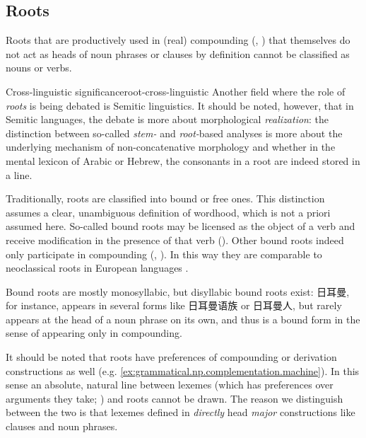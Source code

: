 \documentclass[UTF8, a4paper, oneside, scheme=plain, 12pt]{ctexrep}
\newcommand*{\term}[1]{\emph{#1}}
\begin{document}
\subsection{Roots}\label{sec:grammatical.lexicon.roots}

Roots that are productively used in (real) compounding 
(,
)
that themselves do not act as heads of noun phrases or clauses
by definition cannot be classified as nouns or verbs.

\begin{infobox}{Cross-linguistic significance}{root-cross-linguistic}
    Another field where the role of \term{roots} is being debated is Semitic linguistics.
    It should be noted, however, that in Semitic languages,
    the debate is more about morphological \term{realization}:
    the distinction between so-called \term{stem-} and \term{root-}based analyses
    is more about the underlying mechanism of non-concatenative morphology
    and whether in the mental lexicon of Arabic or Hebrew,
    the consonants in a root are indeed stored in a line.
\end{infobox}

Traditionally, roots are classified into bound or free ones.
This distinction assumes a clear, unambiguous definition of wordhood,
which is not a priori assumed here.
So-called bound roots may be licensed as the object of a verb
and receive modification in the presence of that verb 
().
Other bound roots indeed only participate in compounding
(,
).
In this way they are comparable to neoclassical roots in European languages
\citep{di2005decomposing,scher2014unifying}.

Bound roots are mostly monosyllabic,
but disyllabic bound roots exist:
日耳曼, for instance, appears in several forms like 日耳曼语族 or 日耳曼人,
but rarely appears at the head of a noun phrase on its own,
and thus is a bound form in the sense of appearing only in compounding.

It should be noted that roots have preferences of compounding or derivation constructions as well 
(e.g. \ref{ex:grammatical.np.complementation.machine}).
In this sense an absolute, natural line between lexemes
(which has preferences over arguments they take; ) and roots cannot be drawn.
The reason we distinguish between the two is that 
lexemes defined in 
\emph{directly} head \emph{major} constructions like clauses and noun phrases.
\end{document}
